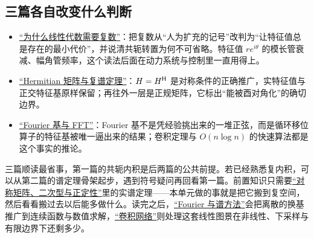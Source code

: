 \subsection{三篇各自改变什么判断}

\begin{itemize}
\tightlist
\item
  \hyperref[sec:03-Linear-Algebra/08-Complex-Matrices-and-Fourier-Structure/01]{``为什么线性代数需要复数''}：把复数从``人为扩充的记号''改判为``让特征值总是存在的最小代价''，并说清共轭转置为何不可省略。特征值 \(re^{i\theta}\) 的模长管衰减、幅角管频率，这个读法后面在动力系统与控制里一直用得上。
\item
  \hyperref[sec:03-Linear-Algebra/08-Complex-Matrices-and-Fourier-Structure/02]{``Hermitian 矩阵与复谱定理''}：\(H=H^{\mathsf{H}}\) 是对称条件的正确推广，实特征值与正交特征基原样保留；再往外一层是正规矩阵，它标出``能被酉对角化''的确切边界。
\item
  \hyperref[sec:03-Linear-Algebra/08-Complex-Matrices-and-Fourier-Structure/03]{``Fourier 基与 FFT''}：Fourier 基不是凭经验挑出来的一堆正弦，而是循环移位算子的特征基被唯一逼出来的结果；卷积定理与 \(O(n\log n)\) 的快速算法都是这个事实的推论。
\end{itemize}

三篇顺读最省事，第一篇的共轭内积是后两篇的公共前提。若已经熟悉复内积，可以从第二篇的谱定理骨架起步，遇到符号疑问再回看第一篇。前置知识只需要\hyperref[ch:021]{``对称矩阵、二次型与正定性''}里的实谱定理——本单元做的事就是把它搬到复空间，然后看看搬过去以后能多做什么。读完之后，\hyperref[ch:068]{``Fourier 与谱方法''}会把离散的换基推广到连续函数与数值求解，\hyperref[ch:126]{``卷积网络''}则处理这套线性图景在非线性、下采样与有限边界下还剩多少。
